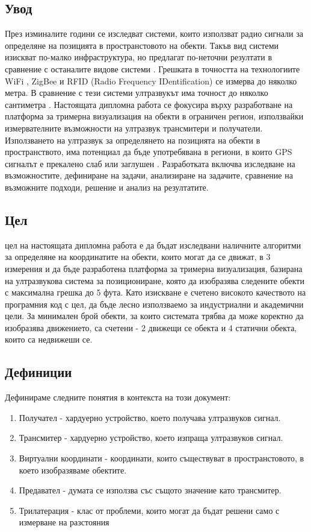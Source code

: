 \subsection{Увод}
\tab През изминалите години се изследват системи, които използват радио сигнали за определяне на позицията в пространстовото на обекти. Такъв вид системи изискват по-малко инфраструктура, но предлагат по-неточни резултати в сравнение с останалите видове системи \cite{CarlosMedina}. Грешката в точността на технологиите WiFi \cite{wifi}, ZigBee \cite{zigbee} и RFID (Radio Frequency IDentification) \cite{rfid} се измерва до няколко метра. В сравнение с тези системи ултразвукът има точност до няколко сантиметра \cite{CarlosMedina} \cite{columbia}. Настоящата дипломна работа се фокусира върху разработване на платформа за тримерна визуализация на обекти в ограничен регион, използвайки измервателните възможности на ултразвук трансмитери и получатели. Използването на ултразвук за определянето на позицията на обекти в пространството, има потенциал да бъде употребявана в региони, в които GPS сигналът е прекалено слаб или заглушен \cite{yonei}. Разработката включва изследване на възможностите, дефиниране на задачи, анализиране на задачите, сравнение на възможните подходи, решение и анализ на резултатите. 

\subsection{Цел}
 цел на настоящата дипломна работа е да бъдат изследвани наличните алгоритми за определяне на координатите на обекти, които могат да се движат, в 3 измерения и да бъде разработена платформа за тримерна визуализация, базирана на ултразвукова система за позициониране, която да изобразява следените обекти с максимална грешка до 5 фута. Като изискване е счетено високото качеството на програмния код с цел, да бъде лесно използваемо за индустриални и академични цели. За минимален брой обекти, за които системата трябва да може коректно да изобразява движението, са счетени - 2 движещи се обекта и 4 статични обекта, които са недвижеши се.

\subsection{Дефиниции}
Дефинираме следните понятия в контекста на този документ:
\begin{enumerate}
    \item Получател - хардуерно устройство, което получава ултразвуков сигнал.
    \item Трансмитер - хардуерно устройство, което изпраща ултразвуков сигнал.
    \item Виртуални координати - координати, които съществуват в пространстовото, в което изобразяваме обектите.
    \item Предавател - думата се използва със същото значение като трансмитер.
    \item Трилатерация - клас от проблеми, които могат да бъдат решени само с измерване на разстояния \cite{murphy}
\end{enumerate}

